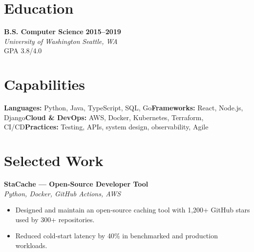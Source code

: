 \documentclass[10pt,letterpaper]{article}
\begin{document}
\section{Education}
\noindent\textbf{B.S. Computer Science} \hfill \textbf{2015--2019}\\
\textit{University of Washington} \hfill \textit{Seattle, WA}\\[2pt]
{\small GPA 3.8/4.0}

\section{Capabilities}
\noindent \textbf{Languages:} Python, Java, TypeScript, SQL, Go\newline \textbf{Frameworks:} React, Node.js, Django\newline \textbf{Cloud \& DevOps:} AWS, Docker, Kubernetes, Terraform, CI/CD\newline \textbf{Practices:} Testing, APIs, system design, observability, Agile

\section{Selected Work}
\noindent\textbf{StaCache --- Open-Source Developer Tool}\\[1pt]
{\small\textit{Python, Docker, GitHub Actions, AWS}}
\begin{itemize}
\item Designed and maintain an open-source caching tool with 1,200+ GitHub stars used by 300+ repositories.
\item Reduced cold-start latency by 40\% in benchmarked and production workloads.
\end{itemize}
\vspace{5pt}
\end{document}
